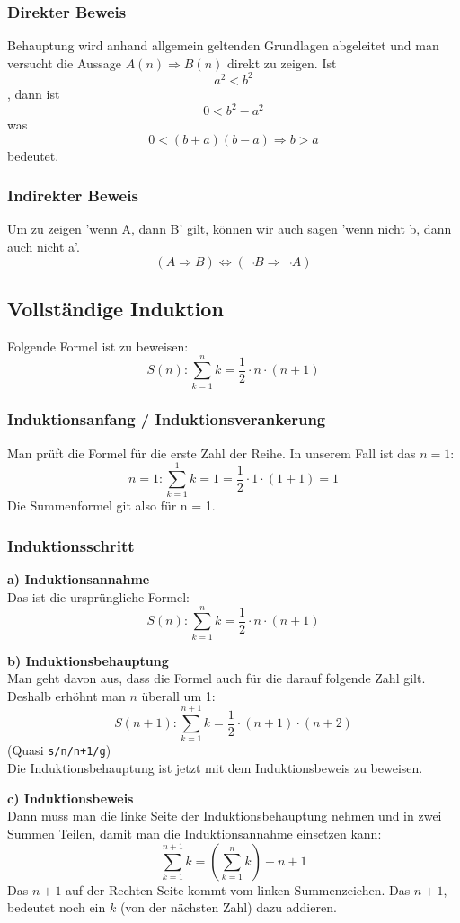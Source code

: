   \subsubsection{Direkter Beweis}
  Behauptung wird anhand allgemein geltenden Grundlagen abgeleitet und man versucht die Aussage $A(n) \Rightarrow B(n)$ direkt zu zeigen.
  Ist \[a^2 < b^2\], dann ist \[0 < b^2 - a^2\] was \[0 < (b + a)(b - a)
  \Rightarrow b > a\] bedeutet.
  \subsubsection{Indirekter Beweis}
  Um zu zeigen 'wenn A, dann B' gilt, können wir auch sagen 'wenn nicht b, dann auch nicht a'.
  \[ (A \Rightarrow B) \Leftrightarrow (\neg B \Rightarrow \neg A) \]

\subsection{Vollständige Induktion}
Folgende Formel ist zu beweisen:
\[ S(n): \sum\limits_{k=1}^n k = \frac{1}{2} \cdot n \cdot (n + 1)\]
\subsubsection{Induktionsanfang / Induktionsverankerung}
Man prüft die Formel für die erste Zahl der Reihe. In unserem Fall ist
das $n = 1$:
\[ n = 1: \sum\limits_{k=1}^1 k = 1 = \frac{1}{2} \cdot 1 \cdot (1 + 1) = 1\]
Die Summenformel git also für n = 1.

\subsubsection{Induktionsschritt}
\textbf{a) Induktionsannahme} \\
Das ist die ursprüngliche Formel:
\[ S(n): \sum\limits_{k=1}^n k = \frac{1}{2} \cdot n \cdot (n + 1)\]

\textbf{b) Induktionsbehauptung} \\
Man geht davon aus, dass die Formel auch für die darauf folgende Zahl
gilt. Deshalb erhöhnt man $n$ überall um 1:
 \[ S(n + 1): \sum\limits_{k=1}^{n+1} k = \frac{1}{2} \cdot (n + 1) \cdot (n + 2)\]
(Quasi \texttt{s/n/n+1/g}) \\
Die Induktionsbehauptung ist jetzt mit dem Induktionsbeweis zu beweisen.

\textbf{c) Induktionsbeweis} \\
Dann muss man die linke Seite der Induktionsbehauptung nehmen und in zwei Summen Teilen,
damit man die Induktionsannahme einsetzen kann:
 \[ \sum\limits_{k=1}^{n+1} k = \left( \sum\limits_{k=1}^{n} k \right) + n + 1 \]
Das $n + 1$ auf der Rechten Seite kommt vom linken Summenzeichen.
Das $n + 1$, bedeutet noch ein $k$ (von der nächsten Zahl) dazu addieren.


